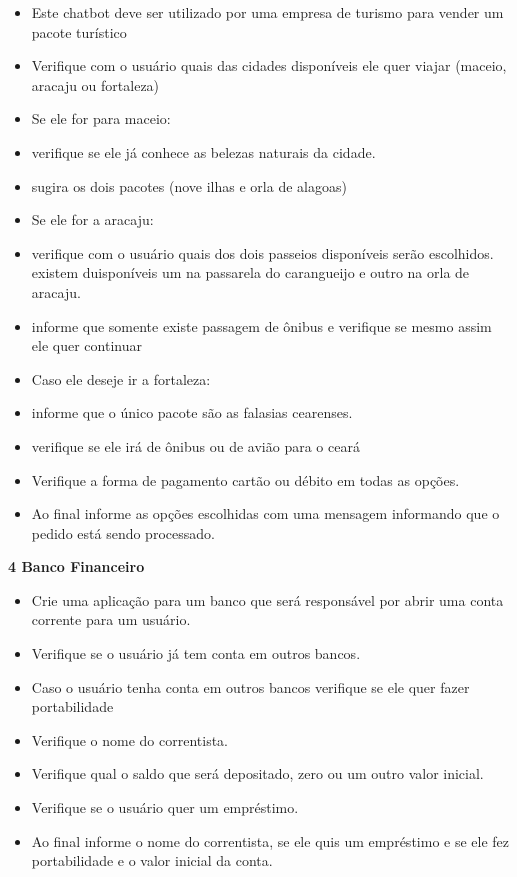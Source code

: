\documentclass[14pt,a4paper,oneside]{book}
\begin{document}
\begin{itemize}[nosep]
	\item Este chatbot deve ser utilizado por uma empresa de turismo para vender um pacote turístico
	\item Verifique com o usuário quais das cidades disponíveis ele quer viajar (maceio, aracaju ou fortaleza)
	\item Se ele for para maceio:
	\item verifique se ele já conhece as belezas naturais da cidade.
	\item sugira os dois pacotes (nove ilhas e orla de alagoas)
	\item Se ele for a aracaju:
	\item verifique com o usuário quais dos dois passeios disponíveis serão escolhidos. existem duisponíveis um na passarela do carangueijo e outro na orla de aracaju.
	\item informe que somente existe passagem de ônibus e verifique se mesmo assim ele quer continuar
	\item Caso ele deseje ir a fortaleza:
	\item informe que o único pacote são as falasias cearenses.
	\item verifique se ele irá de ônibus ou de avião para o ceará
	\item Verifique a forma de pagamento cartão ou débito em todas as opções.
	\item Ao final informe as opções escolhidas com uma mensagem informando que o pedido está sendo processado.
\end{itemize} 

\vspace{\baselineskip}

\textbf{4 Banco Financeiro} \\

\begin{itemize}[nosep]
	\item Crie uma aplicação para um banco que será responsável por abrir uma conta corrente para um usuário.
	\item Verifique se o usuário já tem conta em outros bancos.
	\item Caso o usuário tenha conta em outros bancos verifique se ele quer fazer portabilidade
	\item Verifique o nome do correntista.
	\item Verifique qual o saldo que será depositado, zero ou um outro valor inicial.
	\item Verifique se o usuário quer um empréstimo.
	\item Ao final informe o nome do correntista, se ele quis um empréstimo e se ele fez portabilidade e o valor inicial da conta.
\end{itemize} 
\end{document}
